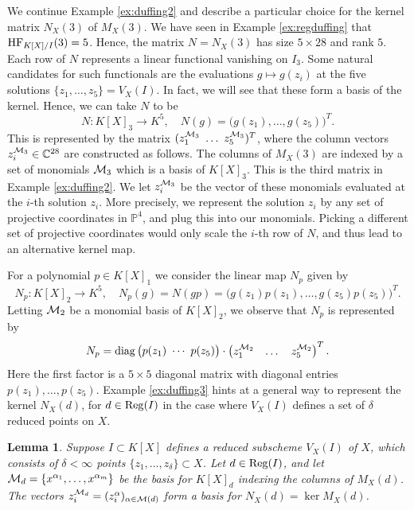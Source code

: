 \documentclass[12pt]{article}
\newtheorem{lemm}[thm]{Lemma}
\theoremstyle{definition}
\newenvironment{example}
  {\pushQED{\qed}\renewcommand{\qedsymbol}{$\diamond$}\examplex}
  {\popQED\endexamplex}
\theoremstyle{remark}
\begin{document}
\begin{example}[$d = 2, e = 1$] \label{ex:duffing3}
We continue Example \ref{ex:duffing2} and describe a particular choice for the kernel matrix $N_X(3)$ of $M_X(3)$. We have seen in Example \ref{ex:regduffing} that ${\rm HF}_{K[X]/I}(3) = 5$. Hence, the matrix $N=N_X(3)$ has size $5\times 28$ and rank $5$. Each row of $N$ represents a linear functional vanishing on $I_3$. Some natural candidates for such functionals are the evaluations $g \mapsto g(z_i)$ at the five solutions $\{z_1, \ldots, z_5\} = V_X(I)$. In fact, we will see that these form a basis of the kernel. Hence, we can take $N$ to be 
\[ N:K[X]_3\rightarrow K^5, \quad N(g)=\big (
    g(z_1),  \dots , g(z_5)\big)^T. \]
This is represented by the matrix $(z_1^{{\cal M}_3}~ \ldots~ z_5^{{\cal M}_3})^T$, where the column vectors $z_i^{{\cal M}_3} \in \mathbb{C}^{28}$ are constructed as follows. The columns of $M_X(3)$ are indexed by a set of monomials ${\cal M}_3$ which is a basis of $K[X]_3$. This is the third matrix in Example \ref{ex:duffing2}. We let $z_i^{{\cal M}_3}$ be the vector of these monomials evaluated at the $i$-th solution $z_i$. More precisely, we represent the solution $z_i$ by any set of projective coordinates in $\mathbb{P}^4$, and plug this into our monomials. Picking a different set of projective coordinates would only scale the $i$-th row of $N$, and thus lead to an alternative kernel map. 

For a polynomial $p\in K[X]_1$ we consider the linear map $N_p$ given by 
\[ N_p:K[X]_2\rightarrow K^5, \quad N_p(g)=N(gp)=\big(
    g(z_1)p(z_1),\dots , g(z_5)p(z_5)\big )^T. \]
Letting ${\cal M}_2$ be a monomial basis of $K[X]_2$, we observe that $N_p$ is represented by 
\[N_p={\rm diag}\begin{pmatrix} p(z_1) ~ \cdots ~ p(z_5) \end{pmatrix}\cdot\begin{pmatrix} z_1^{{\cal M}_2} & \dots & z_5^{{\cal M}_2}
\end{pmatrix}^T.  \]
Here the first factor is a $5 \times 5$ diagonal matrix with diagonal entries $p(z_1), \ldots, p(z_5)$.
\end{example}
 Example \ref{ex:duffing3} hints at a general way to represent the kernel $N_X(d)$, for $d \in {\rm Reg}(I)$ in the case where $V_X(I)$ defines a set of $\delta$ reduced points on $X$.
\begin{lemm} \label{lem:basis}
    Suppose $I \subset K[X]$ defines a reduced subscheme $V_X(I)$ of $X$, which consists of $\delta < \infty$ points $\{z_1, \ldots, z_\delta\} \subset X$. Let $d \in {\rm Reg}(I)$, and let ${\cal M}_d = \{ x^{\alpha_1}, \ldots, x^{\alpha_{m}} \}$ be the basis for $K[X]_d$ indexing the columns of $M_X(d)$. The vectors $z_i^{{\cal M}_d}  = (z_i^\alpha)_{\alpha \in {\cal M}(d)}$ form a basis for $N_X(d) = \ker M_X(d)$.   
\end{lemm}
\end{document}

